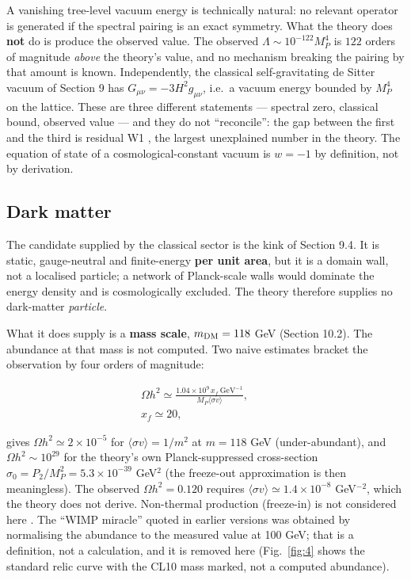 \documentclass[aps,prd,twocolumn,amsmath,amssymb,superscriptaddress,nofootinbib,floatfix]{revtex4-2}
\begin{document}
A vanishing tree-level vacuum energy is technically natural: no relevant
operator is generated if the spectral pairing is an exact symmetry. What
the theory does \textbf{not} do is produce the observed value. The
observed \(\Lambda \sim 10^{-122}M_P^4\) is \(122\) orders of magnitude
\emph{above} the theory's value, and no mechanism breaking the pairing
by that amount is known. Independently, the classical self-gravitating
de Sitter vacuum of Section 9 has \(G_{\mu\nu} = -3H^2 g_{\mu\nu}\),
i.e.~a vacuum energy bounded by \(M_P^4\) on the lattice. These are
three different statements --- spectral zero, classical bound, observed
value --- and they do not ``reconcile'': the gap between the first and
the third is residual W1 \cite{ref37}, the largest unexplained number in
the theory. The equation of state of a cosmological-constant vacuum is
\(w = -1\) by definition, not by derivation.

\subsection{Dark matter}\label{dark-matter}

The candidate supplied by the classical sector is the kink of Section
9.4. It is static, gauge-neutral and finite-energy \textbf{per unit
area}, but it is a domain wall, not a localised particle; a network of
Planck-scale walls would dominate the energy density and is
cosmologically excluded. The theory therefore supplies no dark-matter
\emph{particle}.

What it does supply is a \textbf{mass scale}, \(m_{\rm DM} = 118\) GeV
(Section 10.2). The abundance at that mass is not computed. Two naive
estimates \cite{ref41} bracket the observation by four orders of
magnitude:

\begin{multline}
    \Omega h^2 \simeq \frac{1.04\times10^9\, x_f\ \mathrm{GeV}^{-1}}{M_P\langle\sigma v\rangle},\qquad \\
    x_f \simeq 20,
\end{multline}

gives \(\Omega h^2 \simeq 2\times10^{-5}\) for
\(\langle\sigma v\rangle = 1/m^2\) at \(m = 118\) GeV (under-abundant),
and \(\Omega h^2 \sim 10^{29}\) for the theory's own Planck-suppressed
cross-section \(\sigma_0 = P_2/M_P^2 = 5.3\times10^{-39}\) GeV\(^2\)
(the freeze-out approximation is then meaningless). The observed
\(\Omega h^2 = 0.120\) requires
\(\langle\sigma v\rangle \simeq 1.4\times10^{-8}\) GeV\(^{-2}\), which
the theory does not derive. Non-thermal production (freeze-in) is not
considered here \cite{ref42}. The ``WIMP miracle'' quoted in earlier
versions was obtained by normalising the abundance to the measured value
at 100 GeV; that is a definition, not a calculation, and it is removed
here (Fig.~\ref{fig:4} shows the standard relic curve with the CL10 mass
marked, not a computed abundance).
\end{document}
